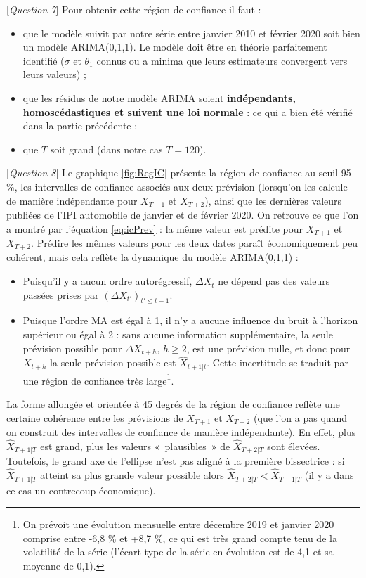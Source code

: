 \documentclass[french]{article}
\providecommand{\tightlist}{%
  \setlength{\itemsep}{0pt}\setlength{\parskip}{0pt}}
\begin{document}
{[}\emph{Question 7}{]} Pour obtenir cette région de confiance il faut :

\begin{itemize}
\tightlist
\item
  que le modèle suivit par notre série entre janvier 2010 et février 2020 soit bien un modèle ARIMA(0,1,1). Le modèle doit être en théorie parfaitement identifié (\(\sigma\) et \(\theta_1\) connus ou a minima que leurs estimateurs convergent vers leurs valeurs) ;
\item
  que les résidus de notre modèle ARIMA soient \textbf{indépendants, homoscédastiques et suivent une loi normale} : ce qui a bien été vérifié dans la partie précédente ;
\item
  que \(T\) soit grand (dans notre cas \(T=120\)).
\end{itemize}

{[}\emph{Question 8}{]} Le graphique \ref{fig:RegIC} présente la région de confiance au seuil 95 \%, les intervalles de confiance associés aux deux prévision (lorsqu'on les calcule de manière indépendante pour \(X_{T+1}\) et \(X_{T+2}\)), ainsi que les dernières valeurs publiées de l'IPI automobile de janvier et de février 2020.
On retrouve ce que l'on a montré par l'équation \eqref{eq:icPrev} : la même valeur est prédite pour \(X_{T+1}\) et \(X_{T+2}\).
Prédire les mêmes valeurs pour les deux dates paraît économiquement peu cohérent, mais cela reflète la dynamique du modèle ARIMA(0,1,1) :

\begin{itemize}
\item
  Puisqu'il y a aucun ordre autorégressif, \(\Delta X_t\) ne dépend pas des valeurs passées prises par \((\Delta X_{t'})_{t'\leq t-1}\).
\item
  Puisque l'ordre MA est égal à 1, il n'y a aucune influence du bruit à l'horizon supérieur ou égal à 2 : sans aucune information supplémentaire, la seule prévision possible pour \(\Delta X_{t+h}\), \(h\geq 2\), est une prévision nulle, et donc pour \(X_{t+h}\) la seule prévision possible est \(\widehat X_{t+1\vert t}\).
  Cette incertitude se traduit par une région de confiance très large\footnote{On prévoit une évolution mensuelle entre décembre 2019 et janvier 2020 comprise entre -6,8 \% et +8,7 \%, ce qui est très grand compte tenu de la volatilité de la série (l'écart-type de la série en évolution est de 4,1 et sa moyenne de 0,1).}.
\end{itemize}

La forme allongée et orientée à 45 degrés de la région de confiance reflète une certaine cohérence entre les prévisions de \(X_{T+1}\) et \(X_{T+2}\) (que l'on a pas quand on construit des intervalles de confiance de manière indépendante).
En effet, plus \(\widehat X_{T+1\vert T}\) est grand, plus les valeurs «~plausibles~» de \(\widehat X_{T+2\vert T}\) sont élevées.
Toutefois, le grand axe de l'ellipse n'est pas aligné à la première bissectrice : si \(\widehat X_{T+1\vert T}\) atteint sa plus grande valeur possible alors \(\widehat X_{T+2\vert T}<\widehat X_{T+1\vert T}\) (il y a dans ce cas un contrecoup économique).
\end{document}
